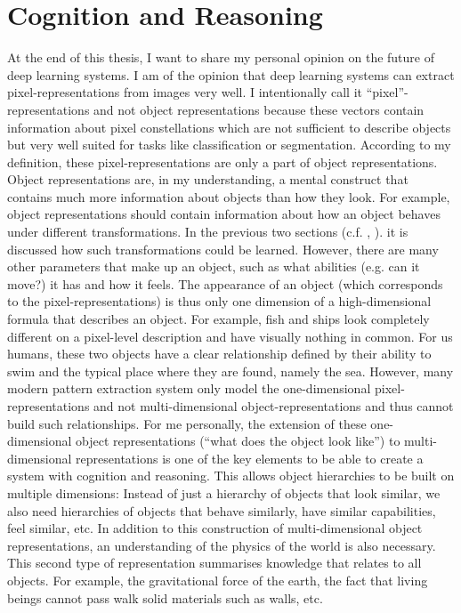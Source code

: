 \section{Cognition and Reasoning}
At the end of this thesis, I want to share my personal opinion on the future of deep learning systems. I am of the opinion that deep learning systems can extract pixel-representations from images very well. I intentionally call it ``pixel''-representations and not object representations because these vectors contain information about pixel constellations which are not sufficient to describe objects but very well suited for tasks like classification or segmentation. According to my definition, these pixel-representations are only a part of object representations. Object representations are, in my understanding, a mental construct that contains much more information about objects than how they look. For example, object representations should contain information about how an object behaves under different transformations. In the previous two sections (c.f. , ). it is discussed how such transformations could be learned. However, there are many other parameters that make up an object, such as what abilities (e.g. can it move?) it has and how it feels. The appearance of an object (which corresponds to the pixel-representations) is thus only one dimension of a high-dimensional formula that describes an object. For example, fish and ships look completely different on a pixel-level description and have visually nothing in common. For us humans, these two objects have a clear relationship defined by their ability to swim and the typical place where they are found, namely the sea.
However, many modern pattern extraction system only model the one-dimensional pixel-representations and not multi-dimensional object-representations and thus cannot build such relationships.
For me personally, the extension of these one-dimensional object representations (``what does the object look like'') to multi-dimensional representations is one of the key elements to be able to create a system with cognition and reasoning. This allows object hierarchies to be built on multiple dimensions: Instead of just a hierarchy of objects that look similar, we also need hierarchies of objects that behave similarly, have similar capabilities, feel similar, etc. In addition to this construction of multi-dimensional object representations, an understanding of the physics of the world is also necessary. This second type of representation summarises knowledge that relates to all objects. For example, the gravitational force of the earth, the fact that living beings cannot pass walk solid materials such as walls, etc.

